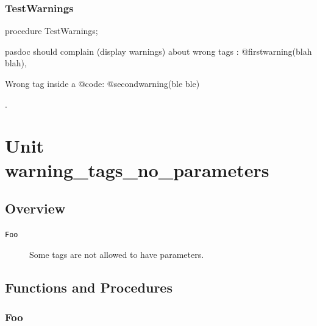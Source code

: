 \documentclass{report}
\newif\ifpdf
\begin{document}
\subsection*{TestWarnings}
\fi
\label{warning_not_existing_tags-TestWarnings}
\begin{list}{}{
\setlength{\itemindent}{0cm}
\setlength{\listparindent}{0cm}
\setlength{\leftmargin}{\evensidemargin}
\addtolength{\leftmargin}{\tmplength}
\settowidth{\labelsep}{X}
\addtolength{\leftmargin}{\labelsep}
\setlength{\labelwidth}{\tmplength}
}
\item[\textbf{Declaration}\hfill]
\ifpdf
\begin{flushleft}
\fi
\begin{ttfamily}
procedure TestWarnings;\end{ttfamily}

\ifpdf
\end{flushleft}
\fi

\par
\item[\textbf{Description}]
pasdoc should complain (display warnings) about wrong tags : @firstwarning(blah blah), \begin{ttfamily}Wrong tag inside a @code: @secondwarning(ble ble)\end{ttfamily}.

\end{list}
\chapter{Unit warning{\_}tags{\_}no{\_}parameters}
\label{warning_tags_no_parameters}
\section{Overview}
\begin{description}
\item[\texttt{Foo}]Some tags are not allowed to have parameters.
\end{description}
\section{Functions and Procedures}
\ifpdf
\subsection*{\large{\textbf{Foo}}\normalsize\hspace{1ex}\hrulefill}
\else
\end{document}
